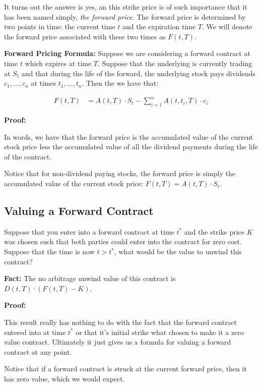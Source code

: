 \documentclass[11pt,]{krantz}
\begin{document}
It turns out the answer is yes, an this strike price is of such importance that it has been named simply, \emph{the forward price}. The forward price is determined by two points in time: the current time \(t\) and the expiration time \(T\). We will denote the forward price associated with these two times as \(F(t, T)\).

\textbf{Forward Pricing Formula:} Suppose we are considering a forward contract at time \(t\) which expires at time \(T\). Suppose that the underlying is currently trading at \(S_{t}\) and that during the life of the forward, the underlying stock pays dividends \(c_{1}, \ldots, c_{n}\) at times \(t_{1}, \ldots, t_{n}\). Then the we have that:

\begin{align*}
F(t, T) &= A(t, T) \cdot S_{t} - \sum_{i=1}^{n} A(t, t_{i}, T) \cdot c_{i}
\end{align*}

\textbf{Proof:}

In words, we have that the forward price is the accumulated value of the current stock price less the accumulated value of all the dividend payments during the life of the contract.

Notice that for non-dividend paying stocks, the forward price is simply the accumulated value of the current stock price: \(F(t, T) = A(t, T) \cdot S_{t}\).

\subsection{Valuing a Forward Contract}\label{valuing-a-forward-contract}

Suppose that you enter into a forward contract at time \(t^{*}\) and the strike price \(K\) was chosen such that both parties could enter into the contract for zero cost. Suppose that the time is now \(t > t^{*}\), what would be the value to unwind this contract?

\textbf{Fact:} The no arbitrage unwind value of this contract is \(D(t, T) \cdot (F(t, T) - K)\).

\textbf{Proof:}

This result really has nothing to do with the fact that the forward contract entered into at time \(t^{*}\) or that it's initial strike what chosen to make it a zero value contract. Ultimately it just gives us a formula for valuing a forward contract at any point.

Notice that if a forward contract is struck at the current forward price, then it has zero value, which we would expect.
\end{document}
